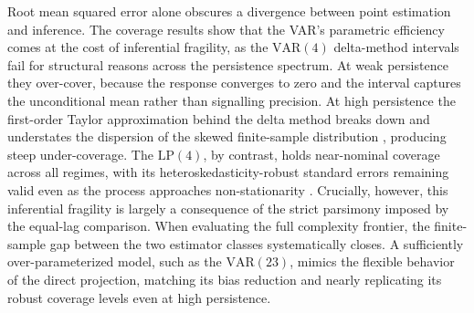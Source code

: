 Root mean squared error alone obscures a divergence between point estimation and inference. The 
coverage results show that the VAR's parametric efficiency comes at the cost of inferential 
fragility, as the $\text{VAR}(4)$ delta-method intervals fail for structural reasons across the 
persistence spectrum. At weak persistence they over-cover, because the response converges to 
zero and the interval captures the unconditional mean rather than signalling precision. At high 
persistence the first-order Taylor approximation behind the delta method breaks down and 
understates the dispersion of the skewed finite-sample distribution \parencite{kilian1999finite}, 
producing steep under-coverage. The $\text{LP}(4)$, by contrast, holds near-nominal coverage 
across all regimes, with its heteroskedasticity-robust standard errors remaining valid even as 
the process approaches non-stationarity \parencite{montiel2021local}. Crucially, however, this 
inferential fragility is largely a consequence of the strict parsimony imposed by the equal-lag 
comparison. When evaluating the full complexity frontier, the finite-sample gap between the two 
estimator classes systematically closes. A sufficiently over-parameterized model, such as the 
$\text{VAR}(23)$, mimics the flexible behavior of the direct projection, matching its bias reduction 
and nearly replicating its robust coverage levels even at high persistence.


\FloatBarrier